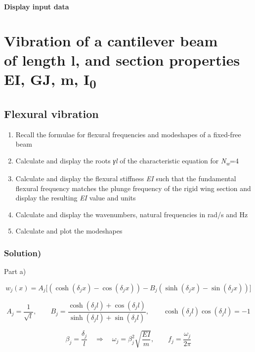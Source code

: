\documentclass[11pt]{article}
\begin{document}
\textbf{Display input data}

\section{\texorpdfstring{Vibration of a cantilever beam\\
of length l, and section properties EI, GJ, m,
I\textsubscript{0}}{Vibration of a cantilever beam of length l, and section properties EI, GJ, m, I0}}\label{vibration-of-a-cantilever-beam-of-length-l-and-section-properties-ei-gj-m-i0}

\subsection{Flexural vibration}\label{flexural-vibration}

\begin{enumerate}
\def\labelenumi{(\alph{enumi})}
\item
  Recall the formulae for flexural frequencies and modeshapes of a
  fixed-free beam
\item
  Calculate and display the roots \emph{γl} of the characteristic
  equation for \emph{N\textsubscript{w}}=4
\item
  Calculate and display the flexural stiffness \emph{EI} such that the
  fundamental flexural frequency matches the plunge frequency of the
  rigid wing section and display the resulting \emph{EI} value and units
\item
  Calculate and display the wavenumbers, natural frequencies in rad/s
  and Hz
\item
  Calculate and plot the modeshapes
\end{enumerate}

\subsubsection{Solution)}\label{solution}

Part a)

\[
w_{j}(x) = A_{j}\Big[(\cosh(\delta_{j} x)-\cos(\delta_{j} x))
 - B_{j}(\sinh(\delta_{j} x)-\sin(\delta_{j} x))\Big]
\]

\[
A_{j} = \frac{1}{\sqrt{l}}, \qquad
B_{j} = \frac{\cosh(\delta_{j} l)+\cos(\delta_{j} l)}
              {\sinh(\delta_{j} l)+\sin(\delta_{j} l)},\qquad
\cosh(\delta_{j} l)\cos(\delta_{j} l) = -1
\]

\[
\beta_{j}=\frac{\delta_{j}}{l} \quad\Rightarrow\quad
\omega_{j} = \beta_{j}^{2}\sqrt{\frac{EI}{m}}, \qquad
f_{j}=\frac{\omega_{j}}{2\pi}
\]
\end{document}
